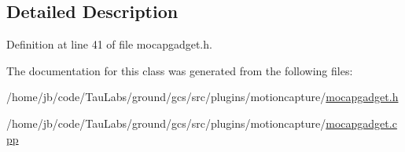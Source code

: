 \subsection{\-Detailed \-Description}


\-Definition at line 41 of file mocapgadget.\-h.



\-The documentation for this class was generated from the following files\-:\begin{DoxyCompactItemize}
\item 
/home/jb/code/\-Tau\-Labs/ground/gcs/src/plugins/motioncapture/\hyperlink{mocapgadget_8h}{mocapgadget.\-h}\item 
/home/jb/code/\-Tau\-Labs/ground/gcs/src/plugins/motioncapture/\hyperlink{mocapgadget_8cpp}{mocapgadget.\-cpp}\end{DoxyCompactItemize}
